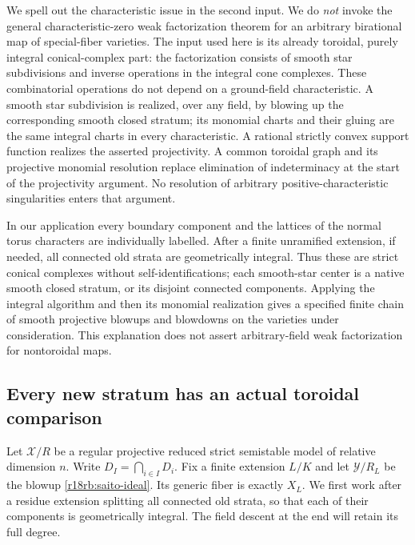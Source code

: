 We spell out the characteristic issue in the second input.  We do
\emph{not} invoke the general characteristic-zero weak factorization
theorem for an arbitrary birational map of special-fiber varieties.
The input used here is its already toroidal, purely integral
conical-complex part: the factorization consists of smooth star
subdivisions and inverse operations in the integral cone complexes.
These combinatorial operations do not depend on a ground-field
characteristic.  A smooth star subdivision is realized, over any field,
by blowing up the corresponding smooth closed stratum; its monomial
charts and their gluing are the same integral charts in every
characteristic.  A rational strictly convex support function realizes
the asserted projectivity.  A common toroidal graph and its projective
monomial resolution replace elimination of indeterminacy at the start
of the projectivity argument.  No resolution of arbitrary
positive-characteristic singularities enters that argument.

In our application every boundary component and the lattices of the
normal torus characters are individually labelled.  After a finite
unramified extension, if needed, all connected old strata are
geometrically integral.  Thus these are strict conical complexes
without self-identifications; each smooth-star center is a native
smooth closed stratum, or its disjoint connected components.  Applying
the integral algorithm and then its monomial realization gives a
specified finite chain of smooth projective blowups and blowdowns
on the varieties under consideration.  This explanation does not
assert arbitrary-field weak factorization for nontoroidal maps.

\subsection{Every new stratum has an actual toroidal comparison}

Let $\mathcal X/R$ be a regular projective reduced strict semistable
model of relative dimension $n$.  Write $D_I=\bigcap_{i\in I}D_i$.
Fix a finite extension $L/K$ and let $\mathcal Y/R_L$ be the blowup
\eqref{r18rb:saito-ideal}.  Its generic fiber is exactly $X_L$.
We first work after a residue extension splitting all connected old
strata, so that each of their components is geometrically integral.
The field descent at the end will retain its full degree.

